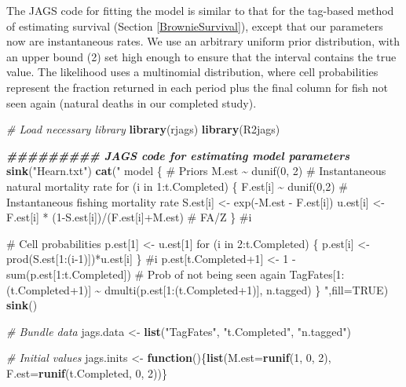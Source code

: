 \documentclass[
]{krantz}
\makeatletter
\newenvironment{Shaded}{\begin{snugshade}}{\end{snugshade}}
\newcommand{\AttributeTok}[1]{\textcolor[rgb]{0.27,0.27,0.27}{#1}}
\newcommand{\CommentTok}[1]{\textcolor[rgb]{0.37,0.37,0.37}{\textit{#1}}}
\newcommand{\ConstantTok}[1]{\textcolor[rgb]{0.37,0.37,0.37}{#1}}
\newcommand{\ControlFlowTok}[1]{\textcolor[rgb]{0.27,0.27,0.27}{\textbf{#1}}}
\newcommand{\DecValTok}[1]{\textcolor[rgb]{0.06,0.06,0.06}{#1}}
\newcommand{\DocumentationTok}[1]{\textcolor[rgb]{0.37,0.37,0.37}{\textbf{\textit{#1}}}}
\newcommand{\FunctionTok}[1]{\textcolor[rgb]{0.27,0.27,0.27}{\textbf{#1}}}
\newcommand{\NormalTok}[1]{#1}
\newcommand{\OtherTok}[1]{\textcolor[rgb]{0.37,0.37,0.37}{#1}}
\newcommand{\StringTok}[1]{\textcolor[rgb]{0.5,0.5,0.5}{#1}}
\newenvironment{kframe}{%
\medskip{}
\setlength{\fboxsep}{.8em}
 \def\at@end@of@kframe{}%
 \ifinner\ifhmode%
  \def\at@end@of@kframe{\end{minipage}}%
  \begin{minipage}{\columnwidth}%
 \fi\fi%
 \def\FrameCommand##1{\hskip\@totalleftmargin \hskip-\fboxsep
 \colorbox{shadecolor}{##1}\hskip-\fboxsep
     \hskip-\linewidth \hskip-\@totalleftmargin \hskip\columnwidth}%
 \MakeFramed {\advance\hsize-\width
   \@totalleftmargin\z@ \linewidth\hsize
   \@setminipage}}%
 {\par\unskip\endMakeFramed%
 \at@end@of@kframe}
\renewenvironment{Shaded}{\begin{kframe}}{\end{kframe}}
\makeatother
\begin{document}
The JAGS code for fitting the model is similar to that for the tag-based method of estimating survival (Section \ref{BrownieSurvival}), except that our parameters now are instantaneous rates. We use an arbitrary uniform prior distribution, with an upper bound (2) set high enough to ensure that the interval contains the true value. The likelihood uses a multinomial distribution, where cell probabilities represent the fraction returned in each period plus the final column for fish not seen again (natural deaths in our completed study).

\begin{Shaded}
\begin{Highlighting}[]
\CommentTok{\# Load necessary library}
\FunctionTok{library}\NormalTok{(rjags)}
\FunctionTok{library}\NormalTok{(R2jags)}

\DocumentationTok{\#\#\#\#\#\#\#\#\# JAGS code for estimating model parameters}
\FunctionTok{sink}\NormalTok{(}\StringTok{"Hearn.txt"}\NormalTok{)}
\FunctionTok{cat}\NormalTok{(}\StringTok{"}
\StringTok{  model \{}
\StringTok{  \# Priors}
\StringTok{  M.est \textasciitilde{} dunif(0, 2)  \# Instantaneous natural mortality rate}
\StringTok{  for (i in 1:t.Completed) \{}
\StringTok{     F.est[i] \textasciitilde{} dunif(0,2) \# Instantaneous fishing mortality rate}
\StringTok{     S.est[i] \textless{}{-} exp({-}M.est {-} F.est[i])}
\StringTok{     u.est[i] \textless{}{-} F.est[i] * (1{-}S.est[i])/(F.est[i]+M.est) \# FA/Z}
\StringTok{  \} \#i}

\StringTok{\# Cell probabilities}
\StringTok{  p.est[1] \textless{}{-} u.est[1]}
\StringTok{  for (i in 2:t.Completed) \{}
\StringTok{    p.est[i] \textless{}{-} prod(S.est[1:(i{-}1)])*u.est[i]}
\StringTok{      \} \#i}
\StringTok{    p.est[t.Completed+1] \textless{}{-} 1 {-} sum(p.est[1:t.Completed])   \# Prob of not being seen again}
\StringTok{  TagFates[1:(t.Completed+1)] \textasciitilde{} dmulti(p.est[1:(t.Completed+1)], n.tagged)}
\StringTok{ \}}
\StringTok{  "}\NormalTok{,}\AttributeTok{fill=}\ConstantTok{TRUE}\NormalTok{)}
\FunctionTok{sink}\NormalTok{()}

\CommentTok{\# Bundle data}
\NormalTok{jags.data }\OtherTok{\textless{}{-}} \FunctionTok{list}\NormalTok{(}\StringTok{"TagFates"}\NormalTok{, }\StringTok{"t.Completed"}\NormalTok{, }\StringTok{"n.tagged"}\NormalTok{)}

\CommentTok{\# Initial values}
\NormalTok{jags.inits }\OtherTok{\textless{}{-}} \ControlFlowTok{function}\NormalTok{()\{}\FunctionTok{list}\NormalTok{(}\AttributeTok{M.est=}\FunctionTok{runif}\NormalTok{(}\DecValTok{1}\NormalTok{, }\DecValTok{0}\NormalTok{, }\DecValTok{2}\NormalTok{), }\AttributeTok{F.est=}\FunctionTok{runif}\NormalTok{(t.Completed, }\DecValTok{0}\NormalTok{, }\DecValTok{2}\NormalTok{))\}}


\end{Highlighting}
\end{Shaded}
\end{document}
